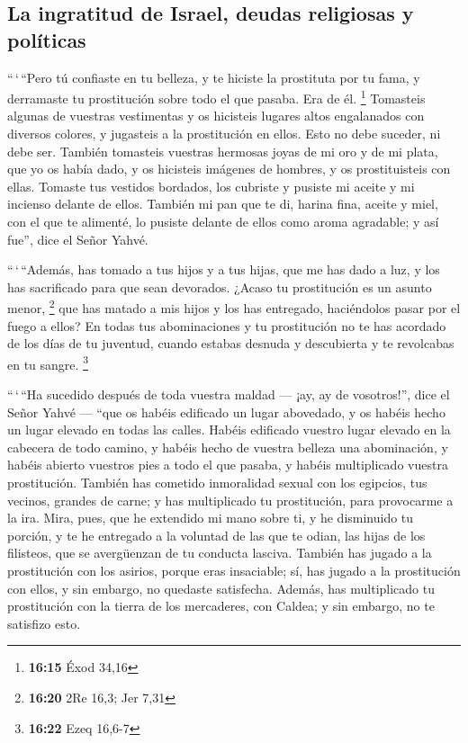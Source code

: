 \begin{paracol}{2}
\hypertarget{la-ingratitud-de-israel-deudas-religiosas-y-poluxedticas}{%
\subsection{La ingratitud de Israel, deudas religiosas y
políticas}\label{la-ingratitud-de-israel-deudas-religiosas-y-poluxedticas}}

 ``\,`\,``Pero tú confiaste en tu belleza, y te hiciste
la prostituta por tu fama, y derramaste tu prostitución sobre todo el
que pasaba. Era de él. \footnote{\textbf{16:15} Éxod 34,16}
 Tomasteis algunas de vuestras vestimentas y os hicisteis
lugares altos engalanados con diversos colores, y jugasteis a la
prostitución en ellos. Esto no debe suceder, ni debe ser.
 También tomasteis vuestras hermosas joyas de mi oro y de
mi plata, que yo os había dado, y os hicisteis imágenes de hombres, y os
prostituisteis con ellas.  Tomaste tus vestidos bordados,
los cubriste y pusiste mi aceite y mi incienso delante de ellos.
 También mi pan que te di, harina fina, aceite y miel,
con el que te alimenté, lo pusiste delante de ellos como aroma
agradable; y así fue'', dice el Señor Yahvé.

 ``\,`\,``Además, has tomado a tus hijos y a tus hijas,
que me has dado a luz, y los has sacrificado para que sean devorados.
¿Acaso tu prostitución es un asunto menor, \footnote{\textbf{16:20} 2Re
  16,3; Jer 7,31}  que has matado a mis hijos y los has
entregado, haciéndolos pasar por el fuego a ellos?  En
todas tus abominaciones y tu prostitución no te has acordado de los días
de tu juventud, cuando estabas desnuda y descubierta y te revolcabas en
tu sangre. \footnote{\textbf{16:22} Ezeq 16,6-7}

 ``\,`\,``Ha sucedido después de toda vuestra maldad ---
¡ay, ay de vosotros!'', dice el Señor Yahvé ---  ``que os
habéis edificado un lugar abovedado, y os habéis hecho un lugar elevado
en todas las calles.  Habéis edificado vuestro lugar
elevado en la cabecera de todo camino, y habéis hecho de vuestra belleza
una abominación, y habéis abierto vuestros pies a todo el que pasaba, y
habéis multiplicado vuestra prostitución.  También has
cometido inmoralidad sexual con los egipcios, tus vecinos, grandes de
carne; y has multiplicado tu prostitución, para provocarme a la ira.
 Mira, pues, que he extendido mi mano sobre ti, y he
disminuido tu porción, y te he entregado a la voluntad de las que te
odian, las hijas de los filisteos, que se avergüenzan de tu conducta
lasciva.  También has jugado a la prostitución con los
asirios, porque eras insaciable; sí, has jugado a la prostitución con
ellos, y sin embargo, no quedaste satisfecha.  Además,
has multiplicado tu prostitución con la tierra de los mercaderes, con
Caldea; y sin embargo, no te satisfizo esto.


\end{paracol}
